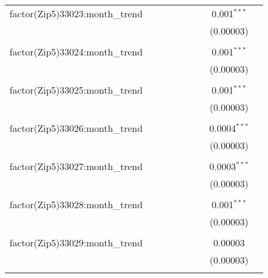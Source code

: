 \begin{table}[H]
{\begin{tabular}{@{\extracolsep{5pt}}lcccccccc}
  factor(Zip5)33023:month\_trend &  &  &  &  &  &  & 0.001$^{***}$ &  \\  

   &  &  &  &  &  &  & (0.00003) &  \\  

   & & & & & & & & \\  

  factor(Zip5)33024:month\_trend &  &  &  &  &  &  & 0.001$^{***}$ &  \\  

   &  &  &  &  &  &  & (0.00003) &  \\  

   & & & & & & & & \\  

  factor(Zip5)33025:month\_trend &  &  &  &  &  &  & 0.001$^{***}$ &  \\  

   &  &  &  &  &  &  & (0.00003) &  \\  

   & & & & & & & & \\  

  factor(Zip5)33026:month\_trend &  &  &  &  &  &  & 0.0004$^{***}$ &  \\  

   &  &  &  &  &  &  & (0.00003) &  \\  

   & & & & & & & & \\  

  factor(Zip5)33027:month\_trend &  &  &  &  &  &  & 0.0003$^{***}$ &  \\  

   &  &  &  &  &  &  & (0.00003) &  \\  

   & & & & & & & & \\  

  factor(Zip5)33028:month\_trend &  &  &  &  &  &  & 0.001$^{***}$ &  \\  

   &  &  &  &  &  &  & (0.00003) &  \\  

   & & & & & & & & \\  

  factor(Zip5)33029:month\_trend &  &  &  &  &  &  & 0.00003 &  \\  

   &  &  &  &  &  &  & (0.00003) &  \\  

   & & & & & & & & \\  


\end{tabular}}
\end{table}
